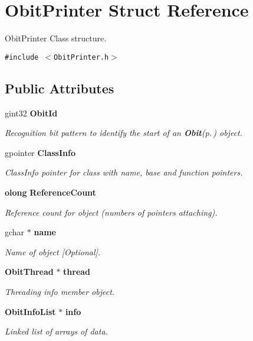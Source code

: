 \section{Obit\-Printer Struct Reference}
\label{structObitPrinter}
Obit\-Printer Class structure.  


{\tt \#include $<$Obit\-Printer.h$>$}

\subsection*{Public Attributes}
\begin{CompactItemize}
\item 
gint32 {\bf Obit\-Id}
\begin{CompactList}\small\item\em Recognition bit pattern to identify the start of an {\bf Obit}{\rm (p.\,\pageref{structObit})} object. \item\end{CompactList}\item 
gpointer {\bf Class\-Info}
\begin{CompactList}\small\item\em Class\-Info pointer for class with name, base and function pointers. \item\end{CompactList}\item 
{\bf olong} {\bf Reference\-Count}
\begin{CompactList}\small\item\em Reference count for object (numbers of pointers attaching). \item\end{CompactList}\item 
gchar $\ast$ {\bf name}
\begin{CompactList}\small\item\em Name of object [Optional]. \item\end{CompactList}\item 
{\bf Obit\-Thread} $\ast$ {\bf thread}
\begin{CompactList}\small\item\em Threading info member object. \item\end{CompactList}\item 
{\bf Obit\-Info\-List} $\ast$ {\bf info}
\begin{CompactList}\small\item\em Linked list of arrays of data. \item\end{CompactList}\item 

\end{CompactItemize}
